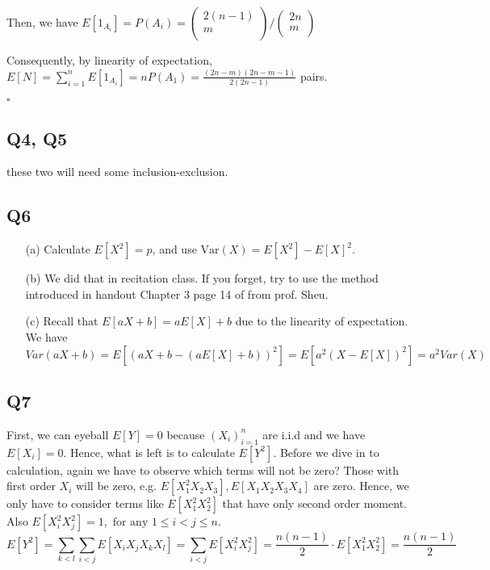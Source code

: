 \documentclass[12pt]{article}
\begin{document}
Then, we have  \(E[1_{A_i}] = P(A_i) = \begin{pmatrix}
     2(n-1) \\
     m \\
\end{pmatrix} / \begin{pmatrix}
     2n \\
     m \\
\end{pmatrix}\)

Consequently, by linearity of expectation,\\
\(E[N] = \sum_{i=1}^{n}E[1_{A_i}] = nP(A_1) = \frac{(2n-m)(2n-m-1)}{2(2n-1)}\) pairs.    

\hspace{\textwidth}\(\square\) 
\subsection*{Q4, Q5} 
these two will need some inclusion-exclusion.
\subsection*{Q6}
\begin{itemize}
    \item[(a)] Calculate \(E[X^2] = p\), and use \(\text{Var}(X) = E[X^2] - E[X]^2\).   
    \item[(b)] We did that in recitation class. If you forget, try to use the method introduced in handout Chapter 3 page 14 of from prof. Sheu.  
    \item[(c)] Recall that \(E[aX +b] = aE[X] + b\) due to the linearity of expectation. We have \(Var(aX+b) = E[(aX+b - (aE[X]+b))^2] = E[a^2(X-E[X])^2] = a^2 Var(X) \) 
\end{itemize}
\subsection*{Q7}
First, we can eyeball \(E[Y] = 0\) because \((X_i)_{i=1}^n\) are i.i.d and we have \(E[X_i] = 0\).  
Hence, what is left is to calculate \(E[Y^2]\). Before we dive in to calculation, again we have to observe which terms will not be zero? 
Those with first order \(X_i\) will be zero, e.g. \(E[X_{1}^2 X_2 X_3 ], E[X_1 X_2 X_3 X_4 ]\) are zero. 
Hence, we only have to consider terms like \(E[X_1^2 X_2^2]\) that have only second order moment. Also \(E[X_i^2 X_j^2] = 1, \text{ for any } 1 \leq i < j \leq n\).   
\[
    E[Y^2] = \sum_{k < l}\sum_{i < j} E[X_i X_j X_k X_l ] =  \sum_{i<j} E[X_i^2 X_j^2] = \frac{n(n-1)}{2} \cdot  E[X_1^2 X_2^2] = \frac{n(n-1)}{2}
\]
\end{document}
